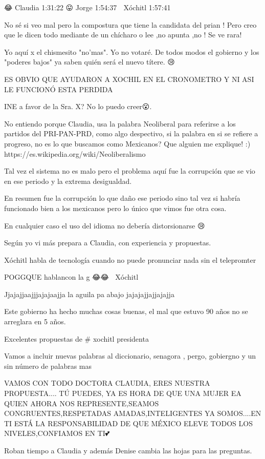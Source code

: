 😂 Claudia 1:31:22
😛 Jorge 1:54:37
🤡 Xóchitl 1:57:41

No sé  si veo mal pero la compostura que tiene la candidata del prian ! Pero creo que le dicen todo mediante de un chícharo o lee ,no apunta ,no ! Se ve rara!

Yo aquí x el chismesito "no'mas". Yo no votaré. De todos modos el gobierno y los "poderes bajos" ya  saben quién será el nuevo títere. 😢

ES OBVIO  QUE AYUDARON A XOCHIL EN EL CRONOMETRO Y NI
 ASI  LE FUNCIONÓ  ESTA PERDIDA

INE a favor de la Sra. X? No lo puedo creer😮.

No entiendo porque Claudia, usa la palabra Neoliberal para referirse a los partidos del PRI-PAN-PRD, como algo despectivo, si la palabra en si se refiere a progreso, no es lo que buscamos como Mexicanos? Que alguien me explique! :) 
https://es.wikipedia.org/wiki/Neoliberalismo

Tal vez el sistema no es malo pero el problema aquí fue la corrupción que se vio en ese periodo y la extrema desigualdad.

En resumen fue la corrupción lo que daño ese periodo sino tal vez si habría funcionado bien a los mexicanos pero lo único que vimos fue otra cosa.

En cualquier caso el uso del idioma no debería distorsionarse 😢

Según yo vi más prepara a Claudia, con experiencia y propuestas.

Xóchitl habla de tecnología cuando no puede pronunciar nada sin el telepromter

POGGQUE hablancon la g 😂😂🤣🤣 Xóchitl

Jjajajjaajjjajajaajja la aguila pa abajo jajajajjajjajajja

Este gobierno ha hecho muchas cosas buenas, el mal que estuvo 90 años no se arreglara en 5 años.

Excelentes propuestas de # xochitl presidenta

Vamos a incluir nuevas palabras al diccionario, senagora , pergo, gobiergno y un sin número de palabras mas

VAMOS CON TODO DOCTORA CLAUDIA, ERES NUESTRA PROPUESTA.... TÚ PUEDES, YA ES HORA DE QUE UNA MUJER EA QUIEN AHORA NOS REPRESENTE,SEAMOS CONGRUENTES,RESPETADAS AMADAS,INTELIGENTES YA SOMOS....EN TI ESTÁ LA RESPONSABILIDAD DE QUE MÉXICO ELEVE TODOS LOS NIVELES,CONFIAMOS EN TI💕

Roban tiempo a Claudia y además Denise cambia las hojas para las preguntas.

